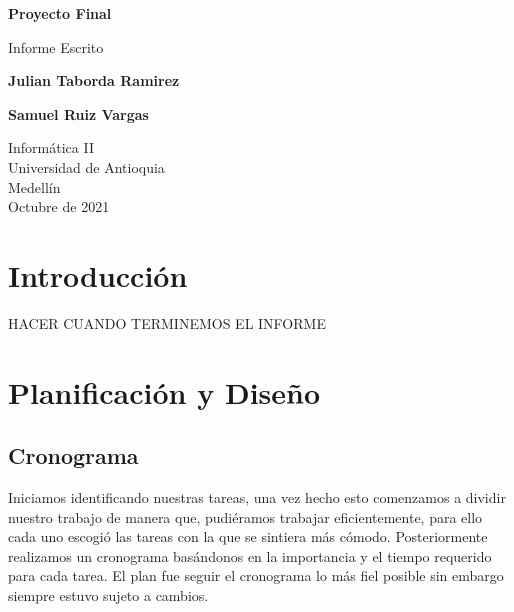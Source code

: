 \documentclass{article}
\begin{document}
\begin{titlepage}
    \begin{center}
        \vspace*{1cm}
            
        \Huge
        \textbf{Proyecto Final}
            
        \vspace{0.5cm}
        \LARGE
        Informe Escrito
            
        \vspace{1.5cm}
            
        \textbf{Julian Taborda Ramirez}
        
        \vspace{0.5cm}
        
        \textbf{Samuel Ruiz Vargas}
            
        \vfill
            
        \vspace{0.8cm}
            
        \Large
        Informática II\\
        Universidad de Antioquia\\
        Medellín\\
        Octubre de 2021
            
    \end{center}
\end{titlepage}

\begin{multicols}{2}
\tableofcontents
\end{multicols}

\newpage

\section{Introducción}
    HACER CUANDO TERMINEMOS EL INFORME 

\section{Planificación y Diseño}
    \subsection{Cronograma}
        Iniciamos identificando nuestras tareas, una vez hecho esto comenzamos a dividir nuestro trabajo de manera que, pudiéramos trabajar eficientemente, para ello cada uno escogió las tareas con la que se sintiera más cómodo. Posteriormente realizamos un cronograma basándonos en la importancia y el tiempo requerido para cada tarea. El plan fue seguir el cronograma lo más fiel posible sin embargo siempre estuvo sujeto a cambios. 
        
\end{document}
